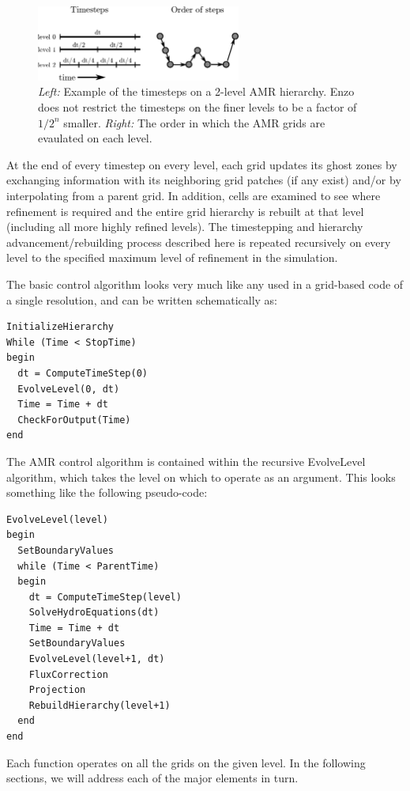 \begin{figure}
\begin{center}
\includegraphics[width=0.6\textwidth]{figures/timestepping.eps}
\end{center}
\caption{\emph{Left:} Example of the timesteps on a 2-level AMR
  hierarchy.  Enzo does not restrict the timesteps on the finer levels
  to be a factor of $1/2^n$ smaller.  \emph{Right:} The order in which
  the AMR grids are evaulated on each level.}
\label{fig:wcycle}
\end{figure}

At the end of every timestep on every level, each grid updates its ghost zones by exchanging information with its neighboring grid patches (if any exist) and/or by interpolating from a parent grid.  In addition, cells are examined to see where refinement is required and the entire grid hierarchy is rebuilt at that level (including all more highly refined levels).  The timestepping and hierarchy advancement/rebuilding process described here is repeated recursively on every level to the specified maximum level of refinement in the simulation. 

The basic control algorithm looks very much like any used in a grid-based code of a single resolution, and can be written schematically as:
\begin{verbatim}
InitializeHierarchy
While (Time < StopTime)
begin
  dt = ComputeTimeStep(0)
  EvolveLevel(0, dt)
  Time = Time + dt
  CheckForOutput(Time)
end
\end{verbatim}
The AMR control algorithm is contained within the recursive
EvolveLevel algorithm, which takes the level on which to operate as an
argument.  This looks something like the following pseudo-code:
\begin{verbatim}
EvolveLevel(level)
begin
  SetBoundaryValues
  while (Time < ParentTime)
  begin
    dt = ComputeTimeStep(level)
    SolveHydroEquations(dt)
    Time = Time + dt
    SetBoundaryValues
    EvolveLevel(level+1, dt)
    FluxCorrection
    Projection
    RebuildHierarchy(level+1)
  end
end
\end{verbatim}

Each function operates on all the grids on the given level.  In the following sections, we will address each of the major elements in turn.

